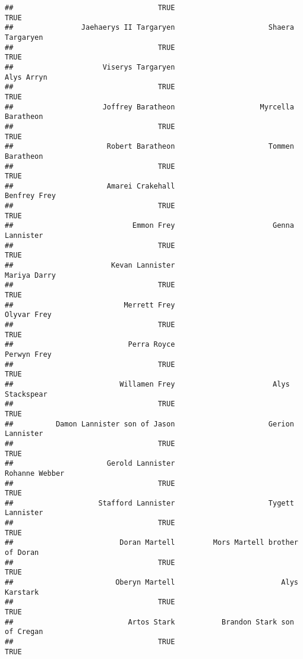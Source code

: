 \documentclass[
]{book}
\begin{document}
\begin{verbatim}
##                                  TRUE                                  TRUE 
##                Jaehaerys II Targaryen                      Shaera Targaryen 
##                                  TRUE                                  TRUE 
##                     Viserys Targaryen                            Alys Arryn 
##                                  TRUE                                  TRUE 
##                     Joffrey Baratheon                    Myrcella Baratheon 
##                                  TRUE                                  TRUE 
##                      Robert Baratheon                      Tommen Baratheon 
##                                  TRUE                                  TRUE 
##                      Amarei Crakehall                          Benfrey Frey 
##                                  TRUE                                  TRUE 
##                            Emmon Frey                       Genna Lannister 
##                                  TRUE                                  TRUE 
##                       Kevan Lannister                          Mariya Darry 
##                                  TRUE                                  TRUE 
##                          Merrett Frey                           Olyvar Frey 
##                                  TRUE                                  TRUE 
##                           Perra Royce                           Perwyn Frey 
##                                  TRUE                                  TRUE 
##                         Willamen Frey                       Alys Stackspear 
##                                  TRUE                                  TRUE 
##          Damon Lannister son of Jason                      Gerion Lannister 
##                                  TRUE                                  TRUE 
##                      Gerold Lannister                        Rohanne Webber 
##                                  TRUE                                  TRUE 
##                    Stafford Lannister                      Tygett Lannister 
##                                  TRUE                                  TRUE 
##                         Doran Martell         Mors Martell brother of Doran 
##                                  TRUE                                  TRUE 
##                        Oberyn Martell                         Alys Karstark 
##                                  TRUE                                  TRUE 
##                           Artos Stark           Brandon Stark son of Cregan 
##                                  TRUE                                  TRUE 

\end{verbatim}
\end{document}
